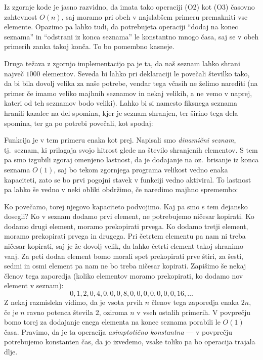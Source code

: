 
Iz zgornje kode je jasno razvidno, da imata tako operaciji (O2) kot (O3) časovno
zahtevnost $O(n)$, saj moramo pri obeh v najslabšem primeru premakniti vse
elemente.
Opazimo pa lahko tudi, da potrebujeta operaciji \enquote{dodaj na konec seznama}
in \enquote{odstrani iz konca seznama} le konstantno mnogo časa, saj se v obeh
primerih zanka takoj konča.
To bo pomembno kasneje.

Druga težava z zgornjo implementacijo pa je ta, da naš seznam lahko shrani
največ $1000$ elementov.
Seveda bi lahko pri deklaraciji  le povečali številko tako,
da bi bila dovolj velika za naše potrebe, vendar tega včasih ne želimo narediti
(na primer če imamo veliko majhnih seznamov in nekaj velikih, a ne vemo v
naprej, kateri od teh seznamov bodo veliki).
Lahko bi si namesto fiksnega seznama  hranili kazalec na del spomina,
kjer je seznam shranjen, ter širino tega dela spomina, ter ga po potrebi
povečali, kot spodaj:


Funkcija  je v tem primeru enaka kot prej.
Napisali smo \emph{dinamični seznam}, tj.~seznam, ki prilagaja svojo hitrost
glede na število shranjenih elementov.
S tem pa smo izgubili zgoraj omenjeno lastnost, da je dodajanje na oz.~brisanje
iz konca seznama $O(1)$, saj bo tekom zgornjega programa velikost vedno enaka
kapaciteti, zato se bo prvi pogojni stavek v funkciji vedno aktiviral.
To lastnost pa lahko še vedno v neki obliki obdržimo, če naredimo majhno
spremembo:


Ko  povečamo, torej njegovo kapaciteto podvojimo.
Kaj pa smo s tem dejansko dosegli?
Ko v seznam dodamo prvi element, ne potrebujemo ničesar kopirati.
Ko dodamo drugi element, moramo prekopirati prvega.
Ko dodamo tretji element, moramo prekopirati prvega in drugega.
Pri četrtem elementu pa nam ni treba ničesar kopirati, saj je  že
dovolj velik, da lahko četrti element takoj shranimo vanj.
Za peti dodan element bomo morali spet prekopirati prve štiri, za šesti, sedmi
in osmi element pa nam ne bo treba ničesar kopirati.
Zapišimo še nekaj členov tega zaporedja (koliko elementov moramo prekopirati, ko
dodamo nov element v seznam):
\[
  0, 1, 2, 0, 4, 0, 0, 0, 8, 0, 0, 0, 0, 0, 0, 0, 16, \ldots
\]
Z nekaj razmisleka vidimo, da je vsota prvih $n$ členov tega zaporedja enaka
$2n$, če je $n$ ravno potenca števila $2$, oziroma $n$ v vseh ostalih primerih.
V povprečju bomo torej za dodajanje enega elementa na konec seznama porabili le
$O(1)$ časa.
Pravimo, da je ta operacija \emph{asimptotično konstantna} --- v povprečju
potrebujemo konstanten čas, da jo izvedemo, vsake toliko pa bo operacija trajala
dlje.


